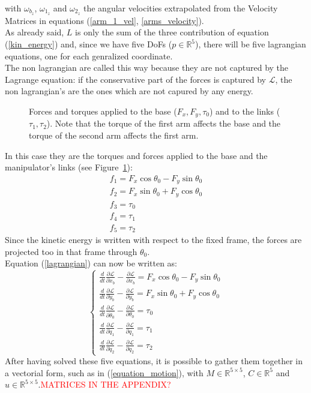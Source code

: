 \documentclass[a4paper,12pt,oneside]{report}
\begin{document}
with $\omega_{b_z}$, $\omega_{1_z}$ and $\omega_{2_z}$ the angular velocities extrapolated from the Velocity Matrices in equations (\ref{arm_1_vel}, \ref{arms_velocity}).\\
As already said, $L$ is only the sum of the three contribution of equation (\ref{kin_energy}) and, since we have five DoFs ($p \in \mathbb{R} ^5$), there will be five lagrangian equations, one for each genralized coordinate.\\
The non lagrangian are called this way because they are not captured by the Lagrange equation: if the conservative part of the forces is captured by $\mathcal{L}$, the non lagrangian's are the ones which are not capured by any energy.\\ 
\begin{figure}
  \centering
  
  \caption{Forces and torques applied to the base ($F_x,F_y,\tau_0$) and to the links ($\tau_1,\tau_2$). Note that the torque of the first arm affects the base and the torque of the second arm affects the first arm.}
  \label{forces}
\end{figure}
In this case they are the torques and forces applied to the base and the manipulator's links (see Figure~\ref{forces}):
\begin{equation}
  \begin{array}{l}
  f_1=F_x\cos{\theta_0}-F_y\sin{\theta_0}\\
  f_2=F_x\sin{\theta_0}+F_y\cos{\theta_0}\\
  f_3=\tau_0\\
  f_4=\tau_1\\
  f_5=\tau_2
  \end{array}
  \label{non_lagrangian}
\end{equation}
Since the kinetic energy is written with respect to the fixed frame, the forces are projected too in that frame through $\theta_0$.\\
Equation (\ref{lagrangian}) can now be written as:
\begin{equation}
  \begin{cases}
    \frac{d}{dt}\frac{\partial \mathcal{L} }{\partial \dot{x}_b}-\frac{\partial \mathcal{L} }{\partial x_b}=F_x\cos{\theta_0}-F_y\sin{\theta_0}\\
    \frac{d}{dt}\frac{\partial \mathcal{L} }{\partial \dot{y}_b}-\frac{\partial \mathcal{L} }{\partial y_b}=F_x\sin{\theta_0}+F_y\cos{\theta_0}\\
    \frac{d}{dt}\frac{\partial \mathcal{L} }{\partial \dot{\theta}_0}-\frac{\partial \mathcal{L} }{\partial \theta_0}=\tau_0\\
    \frac{d}{dt}\frac{\partial \mathcal{L} }{\partial \dot{q}_1}-\frac{\partial \mathcal{L} }{\partial q_1}=\tau_1\\
    \frac{d}{dt}\frac{\partial \mathcal{L} }{\partial \dot{q}_2}-\frac{\partial \mathcal{L} }{\partial q_2}=\tau_2
  \end{cases}
\end{equation}
After having solved these five equations, it is possible to gather them together in a vectorial form, such as in (\ref{equation_motion}), with $M\in\mathbb{R}^{5\times 5}$, $C\in \mathbb{R}^5$ and $u\in\mathbb{R}^{5\times 5}$.\textcolor{red}{MATRICES IN THE APPENDIX?}
\end{document}
